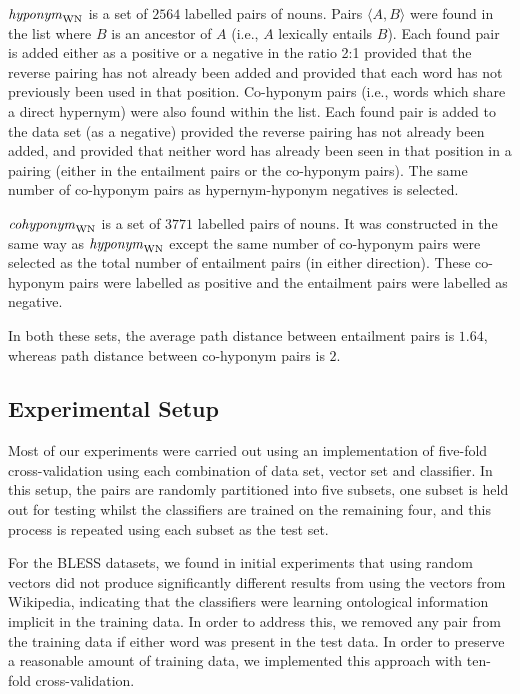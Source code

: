 \documentclass[11pt]{article}
\newcommand\entWN{\mbox{\em hyponym\/}_{\mbox{\scriptsize WN}}}
\newcommand\coordWN{\mbox{\em cohyponym\/}_{\mbox{\scriptsize WN}}}
\begin{document}
\smallskip

\noindent $\entWN$ is a set of $2564$ labelled pairs of nouns.  Pairs $\langle A,B\rangle$ were found in the list where $B$ is an ancestor of $A$ (i.e., $A$ lexically entails $B$).  Each found pair is added either as a positive or a negative in the ratio 2:1 provided that the reverse pairing has not already been added and provided that each word has not previously been used in that position.  Co-hyponym pairs (i.e., words which share a direct hypernym) were also found within the list.  Each found pair is added to the data set (as a negative) provided the reverse pairing has not already been added, and provided that neither word has already been seen in that position in a pairing (either in the entailment pairs or the co-hyponym pairs).  The same number of co-hyponym pairs as hypernym-hyponym negatives is selected. 

\smallskip

\noindent $\coordWN$ is a set of $3771$ labelled pairs of nouns.  It was constructed in the same way as $\entWN$ except the same number of co-hyponym pairs were selected as the total number of entailment pairs (in either direction).  These co-hyponym pairs were labelled as positive and the entailment pairs were labelled as negative.

\smallskip

In both these sets, the average path distance between entailment pairs is $1.64$, whereas path distance between co-hyponym pairs is $2$.

\subsection{Experimental Setup}

Most of our experiments were carried out using an implementation of
five-fold cross-validation using each combination of data set, vector
set and classifier.  In this setup, the pairs are randomly partitioned
into five subsets, one subset is held out for testing whilst the
classifiers are trained on the remaining four, and this process is
repeated using each subset as the test set.

For the BLESS datasets, we found in initial experiments that using
random vectors did not produce significantly different results from
using the vectors from Wikipedia, indicating that the classifiers were
learning ontological information implicit in the training data. In
order to address this, we removed any pair from the training data if
either word was present in the test data. In order to preserve a
reasonable amount of training data, we implemented this approach with
ten-fold cross-validation.
\end{document}
